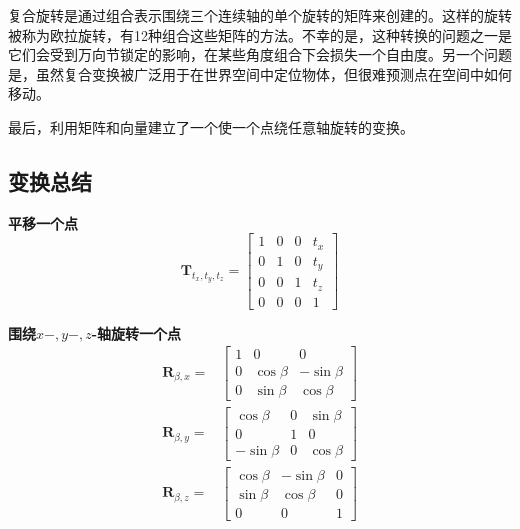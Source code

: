 复合旋转是通过组合表示围绕三个连续轴的单个旋转的矩阵来创建的。这样的旋转被称为欧拉旋转，有12种组合这些矩阵的方法。不幸的是，这种转换的问题之一是它们会受到万向节锁定的影响，在某些角度组合下会损失一个自由度。另一个问题是，虽然复合变换被广泛用于在世界空间中定位物体，但很难预测点在空间中如何移动。

最后，利用矩阵和向量建立了一个使一个点绕任意轴旋转的变换。

\subsection{变换总结}
\textbf{平移一个点}
$$
\mathbf{T}_{t_{x}, t_{y}, t_{z}}=\left[\begin{array}{cccc}
1 & 0 & 0 & t_{x} \\
0 & 1 & 0 & t_{y} \\
0 & 0 & 1 & t_{z} \\
0 & 0 & 0 & 1
\end{array}\right]
$$

\textbf{围绕$x-, y-, z$-轴旋转一个点}
$$
\begin{aligned}
\mathbf{R}_{\beta, x}= & {\left[\begin{array}{ccc}
1 & 0 & 0 \\
0 & \cos \beta & -\sin \beta \\
0 & \sin \beta & \cos \beta
\end{array}\right] } \\
\mathbf{R}_{\beta, y}= & {\left[\begin{array}{ccc}
\cos \beta & 0 & \sin \beta \\
0 & 1 & 0 \\
-\sin \beta & 0 & \cos \beta
\end{array}\right] } \\
\mathbf{R}_{\beta, z}= & {\left[\begin{array}{ccc}
\cos \beta & -\sin \beta & 0 \\
\sin \beta & \cos \beta & 0 \\
0 & 0 & 1
\end{array}\right] }
\end{aligned}
$$


